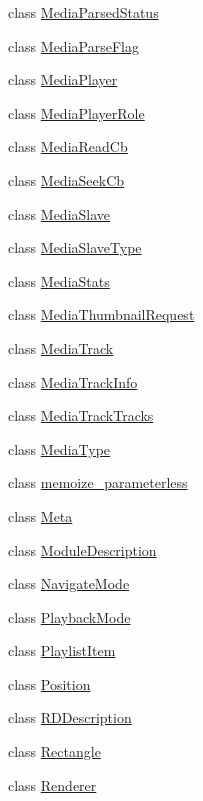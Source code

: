 \begin{DoxyCompactItemize}
class \hyperlink{classvlc_1_1_media_parsed_status}{Media\+Parsed\+Status}
\item 
class \hyperlink{classvlc_1_1_media_parse_flag}{Media\+Parse\+Flag}
\item 
class \hyperlink{classvlc_1_1_media_player}{Media\+Player}
\item 
class \hyperlink{classvlc_1_1_media_player_role}{Media\+Player\+Role}
\item 
class \hyperlink{classvlc_1_1_media_read_cb}{Media\+Read\+Cb}
\item 
class \hyperlink{classvlc_1_1_media_seek_cb}{Media\+Seek\+Cb}
\item 
class \hyperlink{classvlc_1_1_media_slave}{Media\+Slave}
\item 
class \hyperlink{classvlc_1_1_media_slave_type}{Media\+Slave\+Type}
\item 
class \hyperlink{classvlc_1_1_media_stats}{Media\+Stats}
\item 
class \hyperlink{classvlc_1_1_media_thumbnail_request}{Media\+Thumbnail\+Request}
\item 
class \hyperlink{classvlc_1_1_media_track}{Media\+Track}
\item 
class \hyperlink{classvlc_1_1_media_track_info}{Media\+Track\+Info}
\item 
class \hyperlink{classvlc_1_1_media_track_tracks}{Media\+Track\+Tracks}
\item 
class \hyperlink{classvlc_1_1_media_type}{Media\+Type}
\item 
class \hyperlink{classvlc_1_1memoize__parameterless}{memoize\+\_\+parameterless}
\item 
class \hyperlink{classvlc_1_1_meta}{Meta}
\item 
class \hyperlink{classvlc_1_1_module_description}{Module\+Description}
\item 
class \hyperlink{classvlc_1_1_navigate_mode}{Navigate\+Mode}
\item 
class \hyperlink{classvlc_1_1_playback_mode}{Playback\+Mode}
\item 
class \hyperlink{classvlc_1_1_playlist_item}{Playlist\+Item}
\item 
class \hyperlink{classvlc_1_1_position}{Position}
\item 
class \hyperlink{classvlc_1_1_r_d_description}{R\+D\+Description}
\item 
class \hyperlink{classvlc_1_1_rectangle}{Rectangle}
\item 
class \hyperlink{classvlc_1_1_renderer}{Renderer}
\item 

\end{DoxyCompactItemize}
